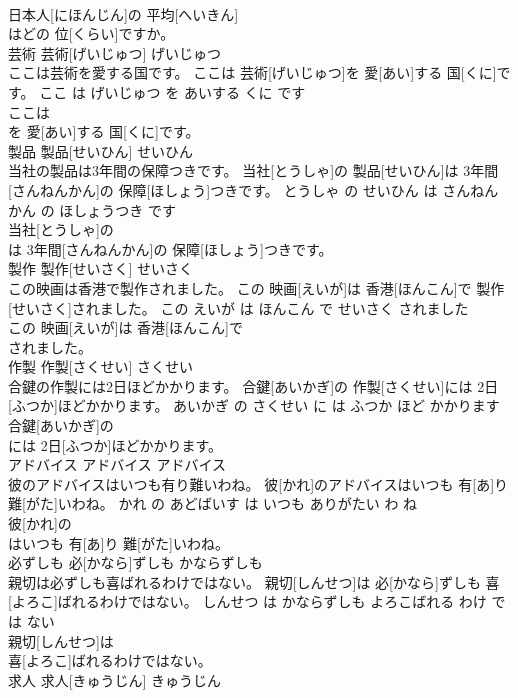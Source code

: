 \documentclass[8pt]{extreport}
\begin{document}
\begin{CJK}{UTF8}{min}
\\	日本人[にほんじん]の 平均[へいきん]
\\	はどの 位[くらい]ですか。			
\\	芸術	芸術[げいじゅつ]	げいじゅつ	
\\	ここは芸術を愛する国です。	ここは 芸術[げいじゅつ]を 愛[あい]する 国[くに]です。	ここ は げいじゅつ を あいする くに です	
\\	ここは
\\	を 愛[あい]する 国[くに]です。			
\\	製品	製品[せいひん]	せいひん	
\\	当社の製品は3年間の保障つきです。	当社[とうしゃ]の 製品[せいひん]は 3年間[さんねんかん]の 保障[ほしょう]つきです。	とうしゃ の せいひん は さんねんかん の ほしょうつき です	
\\	当社[とうしゃ]の
\\	は 3年間[さんねんかん]の 保障[ほしょう]つきです。			
\\	製作	製作[せいさく]	せいさく	
\\	この映画は香港で製作されました。	この 映画[えいが]は 香港[ほんこん]で 製作[せいさく]されました。	この えいが は ほんこん で せいさく されました	
\\	この 映画[えいが]は 香港[ほんこん]で
\\	されました。			
\\	作製	作製[さくせい]	さくせい	
\\	合鍵の作製には2日ほどかかります。	合鍵[あいかぎ]の 作製[さくせい]には 2日[ふつか]ほどかかります。	あいかぎ の さくせい に は ふつか ほど かかります	
\\	合鍵[あいかぎ]の
\\	には 2日[ふつか]ほどかかります。			
\\	アドバイス	アドバイス	アドバイス	
\\	彼のアドバイスはいつも有り難いわね。	彼[かれ]のアドバイスはいつも 有[あ]り 難[がた]いわね。	かれ の あどばいす は いつも ありがたい わ ね	
\\	彼[かれ]の
\\	はいつも 有[あ]り 難[がた]いわね。			
\\	必ずしも	必[かなら]ずしも	かならずしも	
\\	親切は必ずしも喜ばれるわけではない。	親切[しんせつ]は 必[かなら]ずしも 喜[よろこ]ばれるわけではない。	しんせつ は かならずしも よろこばれる わけ で は ない	
\\	親切[しんせつ]は
\\	喜[よろこ]ばれるわけではない。			
\\	求人	求人[きゅうじん]	きゅうじん	

\end{CJK}
\end{document}
